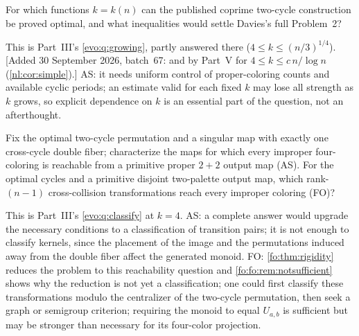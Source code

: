 \documentclass[11pt,a4paper]{article}
\numberwithin{equation}{section}
\theoremstyle{definition}
\theoremstyle{remark}
\begin{document}
\begin{question}\label{fo:as:q:growing}
For which functions $k=k(n)$ can the published coprime two-cycle construction be
proved optimal, and what inequalities would settle Davies's full Problem~2?
\end{question}
This is Part~III's \cref{evo:q:growing}, partly answered there ($4\le
k\le(n/3)^{1/4}$). [Added 30 September 2026, batch~67: and by Part~V for $4\le k\le c\,n/\log n$
(\cref{nl:cor:simple}).] AS: it needs uniform control of proper-coloring counts and
available cyclic periods; an estimate valid for each fixed $k$ may lose all
strength as $k$ grows, so explicit dependence on $k$ is an essential part of
the question, not an afterthought.

\begin{question}\label{fo:q:saturate}
Fix the optimal two-cycle permutation and a singular map with exactly one
cross-cycle double fiber; characterize the maps for which every improper
four-coloring is reachable from a primitive proper $2+2$ output map (AS). For
the optimal cycles and a primitive disjoint two-palette output map, which
rank-$(n-1)$ cross-collision transformations reach every improper coloring
(FO)?
\end{question}
This is Part~III's \cref{evo:q:classify} at $k=4$. AS: a complete answer would
upgrade the necessary conditions to a classification of transition pairs; it
is not enough to classify kernels, since the placement of the image and the
permutations induced away from the double fiber affect the generated monoid.
FO: \cref{fo:thm:rigidity} reduces the problem to this reachability question and
\cref{fo:fo:rem:notsufficient} shows why the reduction is not yet a
classification; one could first classify these transformations modulo the
centralizer of the two-cycle permutation, then seek a graph or semigroup
criterion; requiring the monoid to equal $U_{a,b}$ is sufficient but may be
stronger than necessary for its four-color projection.
\end{document}
